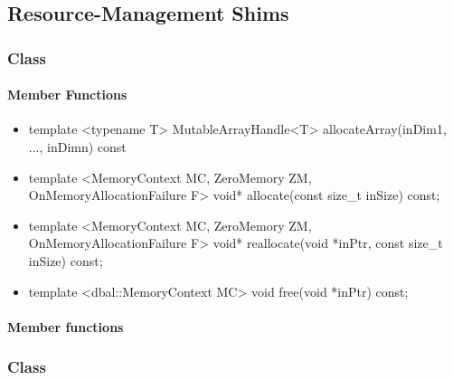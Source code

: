 \subsection{Resource-Management Shims}

\subsubsection[Class Allocator]{Class }

\paragraph{Member Functions}

\begin{itemize}
	\item
		\begin{cppsnippet}
		template <typename T>
		MutableArrayHandle<T> allocateArray(inDim1, ..., inDimn) const
		\end{cppsnippet}
	
	\item
		\begin{cppsnippet}
		template <MemoryContext MC, ZeroMemory ZM, OnMemoryAllocationFailure F>
		void* allocate(const size_t inSize) const;
		\end{cppsnippet}

	\item
		\begin{cppsnippet}
		template <MemoryContext MC, ZeroMemory ZM, OnMemoryAllocationFailure F>
		void* reallocate(void *inPtr, const size_t inSize) const;
		\end{cppsnippet}
	
	\item
		\begin{cppsnippet}
		template <dbal::MemoryContext MC>
		void free(void *inPtr) const;
		\end{cppsnippet}
\end{itemize}


\paragraph{Member functions}

\subsubsection[Class NativeRandomNumberGenerator]{Class }

